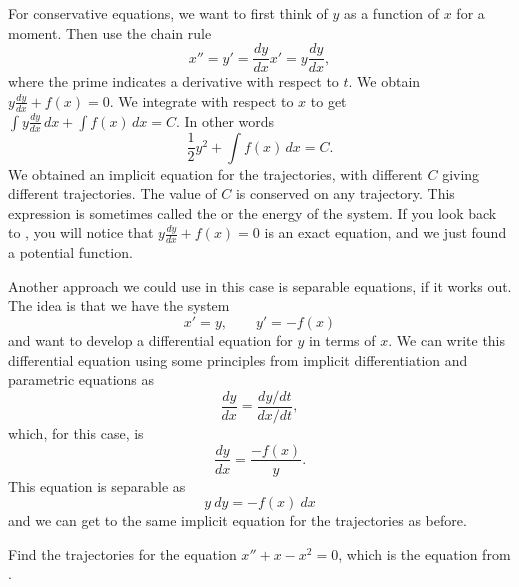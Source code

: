 For conservative equations, we want to first think of $y$ as a function of $x$ for a moment.  Then
use the chain rule
\begin{equation*}
x'' = y' = \frac{dy}{dx} x' = y \frac{dy}{dx} ,
\end{equation*}
where the prime indicates a derivative with respect to $t$.  
We obtain $y \frac{dy}{dx} + f(x) = 0$.  We integrate with respect to
$x$ to get
$\int y \frac{dy}{dx} \,dx + \int f(x)\, dx = C$.  In other words
\begin{equation*}
\frac{1}{2} y^2  + \int f(x)\, dx = C .
\end{equation*}
We obtained an implicit equation for the trajectories, with different $C$
giving different trajectories.  The value of
$C$ is conserved on any trajectory.  This expression is
sometimes called the \emph{} or the energy of the
system.
If you look back to , you will notice
that $y\frac{dy}{dx} + f(x) = 0$ is an exact equation, and
we just found a potential function.

Another approach we could use in this case is separable equations, if it works out. The idea is that we have the system
\begin{equation*}
x' = y, \qquad y' = -f(x)
\end{equation*}
and want to develop a differential equation for $y$ in terms of $x$. We can write this differential equation using some principles from implicit differentiation and parametric equations as
\begin{equation*}
\frac{dy}{dx} = \frac{dy/dt}{dx/dt},
\end{equation*}
which, for this case, is 
\begin{equation*}
\frac{dy}{dx} = \frac{-f(x)}{y}.
\end{equation*}
This equation is separable as
\begin{equation*}
y\ dy = -f(x)\ dx
\end{equation*}
and we can get to the same implicit equation for the trajectories as before. 

\begin{example}
Find the trajectories for the equation $x'' + x-x^2 = 0$,
which is the equation from
.
\end{example}

